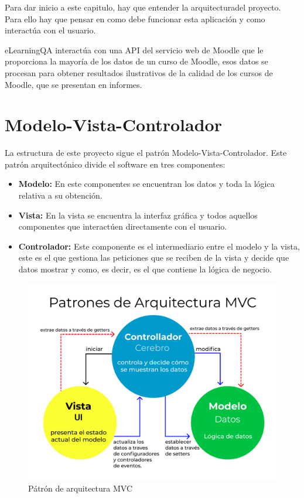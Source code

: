 Para dar inicio a este capitulo, hay que entender la arquitecturadel proyecto. Para ello hay que pensar en como debe funcionar esta aplicación y como interactúa con el usuario.

eLearningQA interactúa con una API del servicio web de Moodle que le proporciona la mayoría de los datos de un curso de Moodle, esos datos se procesan para obtener resultados ilustrativos de la calidad de los cursos de Moodle, que se presentan en informes. 

\section{Modelo-Vista-Controlador}
La estructura de este proyecto sigue el patrón Modelo-Vista-Controlador\cite{mvc}. Este patrón arquitectónico divide el software en tres componentes:
\begin{itemize}
    \item \textbf{Modelo:} En este componentes se encuentran los datos y toda la lógica relativa a su obtención.
    \item \textbf{Vista:} En la vista se encuentra la interfaz gráfica y todos aquellos componentes que interactúen directamente con el usuario.
    \item \textbf{Controlador:} Este componente es el intermediario entre el modelo y la vista, este es el que gestiona las peticiones que se reciben de la vista y decide que datos mostrar y como, es decir, es el que contiene la lógica de negocio.
\end{itemize}

\begin{figure}[H]
    \centering
    \includegraphics[width=0.80\linewidth]{img/MVC.png}
    \caption{Pátrón de arquitectura MVC}
    \label{fig:mvc-imagen}
\end{figure}

